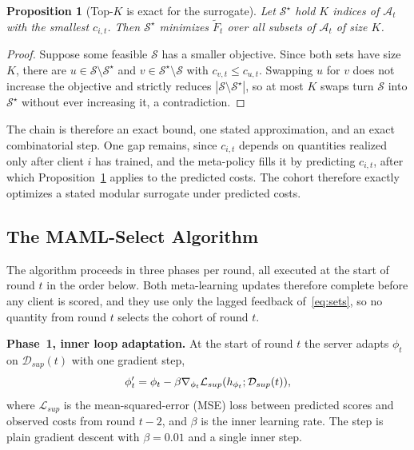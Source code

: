 \documentclass[journal]{IEEEtran}
\newtheorem{proposition}{Proposition}
\theoremstyle{remark}
\newcommand{\revision}[1]{#1}
\newcommand{\revtwo}[1]{#1}
\begin{document}
\begin{proposition}[\revtwo{Top-$K$ is exact for the surrogate}]\label{prop:topk}
\revtwo{Let $\mathcal{S}^\star$ hold $K$ indices of $\mathcal{A}_t$ with the smallest $c_{i,t}$. Then $\mathcal{S}^\star$ minimizes $\widetilde{F}_t$ over all subsets of $\mathcal{A}_t$ of size $K$.}
\end{proposition}
\begin{proof}
\revtwo{Suppose some feasible $\mathcal{S}$ has a smaller objective. Since both sets have size $K$, there are $u\in\mathcal{S}\setminus\mathcal{S}^\star$ and $v\in\mathcal{S}^\star\setminus\mathcal{S}$ with $c_{v,t}\le c_{u,t}$. Swapping $u$ for $v$ does not increase the objective and strictly reduces $|\mathcal{S}\setminus\mathcal{S}^\star|$, so at most $K$ swaps turn $\mathcal{S}$ into $\mathcal{S}^\star$ without ever increasing it, a contradiction.}
\end{proof}

\revtwo{The chain is therefore an exact bound, one stated approximation, and an exact combinatorial step. One gap remains, since $c_{i,t}$ depends on quantities realized only after client $i$ has trained, and the meta-policy fills it by predicting $c_{i,t}$, after which Proposition~\ref{prop:topk} applies to the predicted costs. The cohort therefore exactly optimizes a stated modular surrogate under predicted costs.}

\subsection{The MAML-Select Algorithm}\label{sec:method_selection}
The algorithm proceeds in three phases per round\revtwo{, all executed at the start of round $t$ in the order below. Both meta-learning updates therefore complete before any client is scored, and they use only the lagged feedback of~\eqref{eq:sets}, so no quantity from round $t$ selects the cohort of round $t$}.

\textbf{Phase~1, inner loop adaptation.}
\revision{At the start of round $t$ the server adapts $\phi_t$ on $\mathcal{D}_{sup}(t)$ with one gradient step,}
\begin{equation}
	\color{black}
		\phi'_t = \phi_t - \beta \nabla_{\phi_t} \mathcal{L}_{sup}(h_{\phi_t};\mathcal{D}_{sup}(t)),
		\label{eq:inner_loop}
\end{equation}
where $\mathcal{L}_{sup}$ is the mean-squared-error (MSE) loss between predicted scores and observed costs \revtwo{from round $t-2$}, and $\beta$ is the inner learning rate\revtwo{. The step is plain gradient descent with $\beta=0.01$ and a single inner step}.
\end{document}

